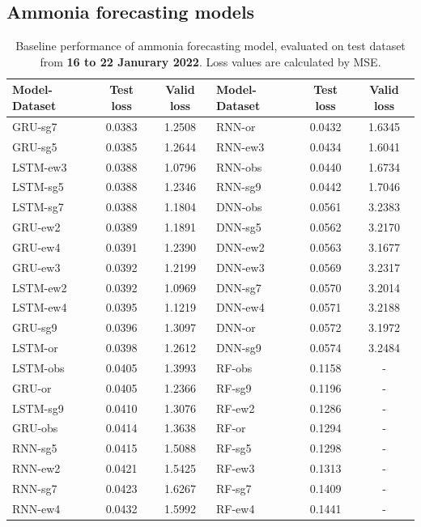 \subsection{Ammonia forecasting models}
\begin{table}[!ht]
  \centering
  \caption{Baseline performance of ammonia forecasting model, evaluated on test dataset from \textbf{16 to 22 Janurary 2022}. Loss values are calculated by MSE.}\label{tab:baseline-result-jan-nh3}
  \begin{NiceTabular}{lcclcc}
      \toprule
      Model-Dataset & Test loss & Valid loss & Model-Dataset & Test loss & Valid loss \\
      \midrule
      GRU-sg7  & 0.0383 &1.2508&RNN-or  & 0.0432&1.6345 \\
      GRU-sg5  & 0.0385 &1.2644&RNN-ew3 & 0.0434&1.6041 \\
      LSTM-ew3 & 0.0388 &1.0796&RNN-obs & 0.0440&1.6734 \\
      LSTM-sg5 & 0.0388 &1.2346&RNN-sg9 & 0.0442&1.7046 \\
      LSTM-sg7 & 0.0388 &1.1804&DNN-obs & 0.0561&3.2383 \\
      GRU-ew2  & 0.0389 &1.1891&DNN-sg5 & 0.0562&3.2170 \\
      GRU-ew4  & 0.0391 &1.2390&DNN-ew2 & 0.0563&3.1677 \\
      GRU-ew3  & 0.0392 &1.2199&DNN-ew3 & 0.0569&3.2317 \\
      LSTM-ew2 & 0.0392 &1.0969&DNN-sg7 & 0.0570&3.2014 \\
      LSTM-ew4 & 0.0395 &1.1219&DNN-ew4 & 0.0571&3.2188 \\
      GRU-sg9  & 0.0396 &1.3097&DNN-or  & 0.0572&3.1972 \\
      LSTM-or  & 0.0398 &1.2612&DNN-sg9 & 0.0574&3.2484 \\
      LSTM-obs & 0.0405 &1.3993&RF-obs  & 0.1158&- \\
      GRU-or   & 0.0405 &1.2366&RF-sg9  & 0.1196&- \\
      LSTM-sg9 & 0.0410 &1.3076&RF-ew2  & 0.1286&- \\
      GRU-obs  & 0.0414 &1.3638&RF-or   & 0.1294&- \\
      RNN-sg5  & 0.0415 &1.5088&RF-sg5  & 0.1298&- \\
      RNN-ew2  & 0.0421 &1.5425&RF-ew3  & 0.1313&- \\
      RNN-sg7  & 0.0423 &1.6267&RF-sg7  & 0.1409&- \\
      RNN-ew4  & 0.0432 &1.5992&RF-ew4  & 0.1441&- \\
      \bottomrule
  \end{NiceTabular}
\end{table}

